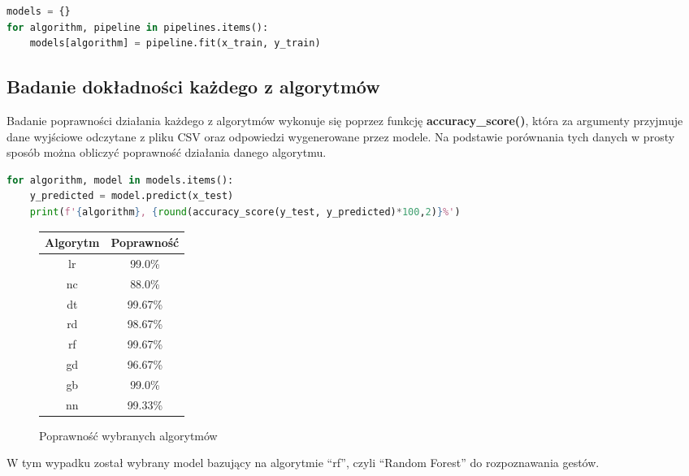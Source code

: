 \begin{lstlisting}[language=python, style=programming, captionpos=b, caption={Trenowanie modeli}]
models = {}
for algorithm, pipeline in pipelines.items():
    models[algorithm] = pipeline.fit(x_train, y_train)
\end{lstlisting}


\subsection{Badanie dokładności każdego z algorytmów}

\quad Badanie poprawności działania każdego z algorytmów wykonuje się poprzez funkcję \textbf{accuracy\_score()}, która za argumenty przyjmuje dane wyjściowe odczytane z pliku CSV oraz odpowiedzi wygenerowane przez modele. Na podstawie porównania tych danych w prosty sposób można obliczyć poprawność działania danego algorytmu.  \newline

\begin{lstlisting}[language=python, style=programming, captionpos=b, caption={Sprawdzenie poprawności}]
for algorithm, model in models.items():
    y_predicted = model.predict(x_test)
    print(f'{algorithm}, {round(accuracy_score(y_test, y_predicted)*100,2)}%')
\end{lstlisting}

\begin{figure}[H]
    \begin{center}
        \begin{tabular}{ |c|c| } 
            \hline
            Algorytm & Poprawność \\
            \hline
            lr & 99.0\% \\
            nc & 88.0\% \\
            dt & 99.67\% \\
            rd & 98.67\% \\ 
            rf & 99.67\% \\ 
            gd & 96.67\% \\ 
            gb & 99.0\% \\
            nn & 99.33\% \\ 
            \hline
        \end{tabular}
    \end{center}    
    \caption{Poprawność wybranych algorytmów}
\end{figure}

\quad W tym wypadku został wybrany model bazujący na algorytmie \enquote{rf}, czyli \enquote{Random Forest} do rozpoznawania gestów. 

